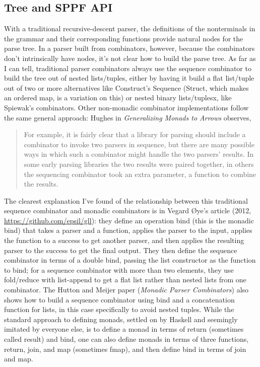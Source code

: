 \documentclass[12pt]{article}
\begin{document}
\subsection{Tree and SPPF API}
\label{sec:tree_sppf_api}

With a traditional recursive-descent parser, the definitions of the
nonterminals in the grammar and their corresponding functions provide
natural nodes for the parse tree.  In a parser built from combinators,
however, because the combinators don't intrinsically have nodes, it's
not clear how to build the parse tree.  As far as I can tell,
traditional parser combinators always use the sequence combinator to
build the tree out of nested lists/tuples, either by having it build a
flat list/tuple out of two or more alternatives like Construct's
Sequence (Struct, which makes an ordered map, is a variation on this)
or nested binary lists/tuplesx, like Spiewak's combinators.  Other
non-monadic combinator implementations follow the same general
approach: Hughes in \emph{Generalizing Monads to Arrows} observes,

\begin{quote}
  For example, it is fairly clear that a library for parsing should
  include a combinator to invoke two parsers in sequence, but there
  are many possible ways in which such a combinator might handle the
  two parsers' results.  In some early parsing libraries the two
  results were paired together, in others the sequencing combinator
  took an extra parameter, a function to combine the results.
\end{quote}

The clearest explanation I've found of the relationship between this
traditional sequence combinator and monadic combinators is in Vegard
\O ye's article (2012, \url{https://github.com/epsil/gll}): they
define an operation bind (this is the monadic bind) that takes a
parser and a function, applies the parser to the input, applies the
function to a success to get another parser, and then applies the
resulting parser to the success to get the final output.  They then
define the sequence combinator in terms of a double bind, passing the
list constructor as the function to bind; for a sequence combinator
with more than two elements, they use fold/reduce with list-append to
get a flat list rather than nested lists from one combinator.  The
Hutton and Meijer paper (\emph{Monadic Parser Combinators}) also shows
how to build a sequence combinator using bind and a concatenation
function for lists, in this case specifically to avoid nested tuples.
While the standard approach to defining monads, settled on by Haskell
and seemingly imitated by everyone else, is to define a monad in terms
of return (sometimes called result) and bind, one can also define
monads in terms of three functions, return, join, and map (sometimes
fmap), and then define bind in terms of join and map.
\end{document}

